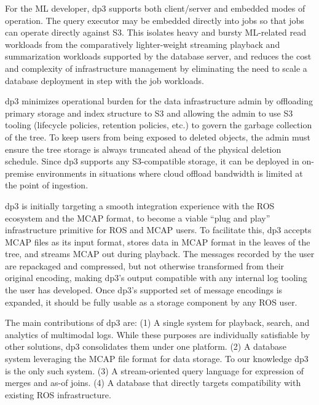 \documentclass[9pt,twocolumn]{article}
\newcommand{\q}[1]{``#1''}
\begin{document}
    For the ML developer, dp3 supports both client/server and embedded modes of
    operation. The query executor may be embedded directly into jobs so that jobs
    can operate directly against S3. This isolates heavy and bursty ML-related read
    workloads from the comparatively lighter-weight streaming playback and
    summarization workloads supported by the database server, and reduces the cost
    and complexity of infrastructure management by eliminating the need to scale a
    database deployment in step with the job workloads.

    dp3 minimizes operational burden for the data infrastructure admin by
    offloading primary storage and index structure to S3 and allowing the admin
    to use S3 tooling (lifecycle policies, retention policies, etc.) to govern
    the garbage collection of the tree. To keep users from being exposed to
    deleted objects, the admin must ensure the tree storage is always truncated
    ahead of the physical deletion schedule. Since dp3 supports any
    S3-compatible storage, it can be deployed in on-premise environments in
    situations where cloud offload bandwidth is limited at the point of
    ingestion.

    dp3 is initially targeting a smooth integration experience with the ROS
    \cite{Quigley09} ecosystem and the MCAP \cite{MCAP} format, to become a viable
    \q{plug and play} infrastructure primitive for ROS and MCAP users. To
    facilitate this, dp3 accepts MCAP files as its input format, stores data in
    MCAP format in the leaves of the tree, and streams MCAP out during playback.
    The messages recorded by the user are repackaged and compressed, but not
    otherwise transformed from their original encoding, making dp3’s output
    compatible with any internal log tooling the user has developed. Once dp3’s
    supported set of message encodings is expanded, it should be fully usable as a
    storage component by any ROS user.

    The main contributions of dp3 are: (1) A single system for playback,
    search, and analytics of multimodal logs. While these purposes are
    individually satisfiable by other solutions, dp3 consolidates them under
    one platform. (2) A database system leveraging the MCAP file format for
    data storage. To our knowledge dp3 is the only such system. (3) A
    stream-oriented query language for expression of merges and as-of joins.
    (4) A database that directly targets compatibility with existing ROS
    infrastructure.
\end{document}

